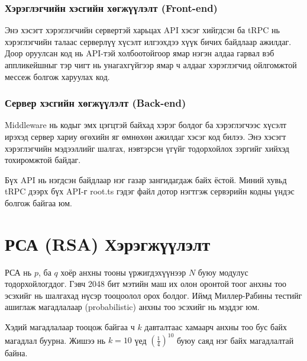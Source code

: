 \subsubsection[Front-end]{Хэрэглэгчийн хэсгийн хөгжүүлэлт (Front-end)}
Энэ хэсэгт хэрэглэгчийн сервертэй харьцах API хэсэг хийгдсэн ба tRPC нь хэрэглэгчийн талаас серверлүү хүсэлт илгээхдээ хүүк бичих байдлаар ажилдаг. Доор оруулсан код нь  API-тэй холбоотойгоор ямар нэгэн алдаа гарвал вэб аппликейшныг тэр чигт нь унагахгүйгээр ямар ч алдааг хэрэглэгчид ойлгомжтой мессеж болгож харуулах код.


\subsubsection[Back-end]{Сервер хэсгийн хөгжүүлэлт (Back-end)}
Middleware нь кодыг эмх цэгцтэй байхад хэрэг болдог ба хэрэглэгчээс хүсэлт ирэхэд сервер хариу өгөхийн яг өмнөхөн ажилдаг хэсэг код билээ. Энэ хэсэгт хэрэглэгчийн мэдээллийг шалгах, нэвтэрсэн үгүйг тодорхойлох зэргийг хийхэд тохиромжтой байдаг.

Бүх API нь нэгдсэн байдлаар нэг газар зангидагдаж байх ёстой. Миний хувьд tRPC дээрх бүх API-г root.ts гэдэг файл дотор нэгтгэж сервэрийн кодны үндэс болгож байгаа юм.


\section{РСА (RSA) Хэрэгжүүлэлт}
РСА нь $p$, ба  $q$ хоёр анхны тооны үржигдэхүүнээр $N$ буюу модулус тодорхойлогддог. Гэвч 2048 бит мэтийн маш их олон оронтой тоог анхны тоо эсэхийг нь шалгахад нүсэр тооцоолол орох болдог. Иймд Миллер-Рабины тестийг ашиглаж магадлалаар (probabilistic) анхны тоо эсэхийг нь мэддэг юм.




Хэдий магадлалаар тооцож байгаа ч $k$ давталтаас хамаарч анхны тоо бус байх магадлал буурна. Жишээ нь $k = 10$ үед $\left(\frac{1}{4}\right)^{10}$ буюу саяд нэг байх магадлалтай байна.





